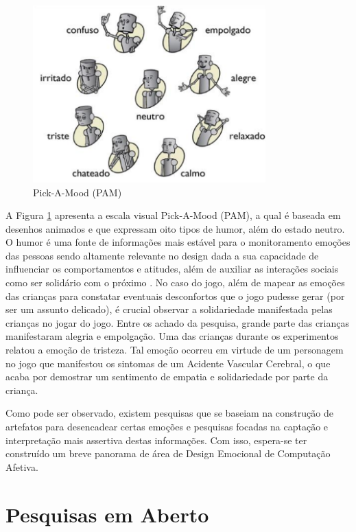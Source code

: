 \documentclass[12pt]{article}
\begin{document}
\begin{figure}[ht]
\centering
\includegraphics[width=0.8\textwidth]{Figuras/PAM.png}
\caption{Pick-A-Mood (PAM) \cite{santa2014teste}}
\label{fig:PAM}
\end{figure}

A Figura \ref{fig:PAM} apresenta a escala visual Pick-A-Mood (PAM), a qual é baseada em desenhos animados e que expressam oito tipos de humor, além do estado neutro. O humor é uma fonte de informações mais estável para o monitoramento emoções das pessoas sendo altamente relevante no design dada a sua capacidade de influenciar os comportamentos e atitudes, além de auxiliar as interações sociais como ser solidário com o próximo \cite{desmet2012pick}. No caso do jogo, além de mapear as emoções das crianças para constatar eventuais desconfortos que o jogo pudesse gerar (por ser um assunto delicado), é crucial observar a solidariedade manifestada pelas crianças no jogar do jogo. Entre os achado da pesquisa, grande parte das crianças manifestaram alegria e empolgação. Uma das crianças durante os experimentos relatou a emoção de tristeza. Tal emoção ocorreu em virtude de um personagem no jogo que manifestou os sintomas de um Acidente Vascular Cerebral, o que acaba por demostrar um sentimento de empatia e solidariedade por parte da criança. 

Como pode ser observado, existem pesquisas que se baseiam na construção de artefatos para desencadear certas emoções e pesquisas focadas na captação e interpretação mais assertiva destas informações. Com isso, espera-se ter construído um breve panorama de área de Design Emocional de Computação Afetiva. 


\section{Pesquisas em Aberto}\label{secao:desenvolvimento}
\end{document}

